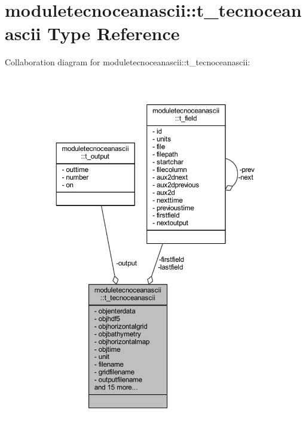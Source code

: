 \hypertarget{structmoduletecnoceanascii_1_1t__tecnoceanascii}{}\section{moduletecnoceanascii\+:\+:t\+\_\+tecnoceanascii Type Reference}
\label{structmoduletecnoceanascii_1_1t__tecnoceanascii}


Collaboration diagram for moduletecnoceanascii\+:\+:t\+\_\+tecnoceanascii\+:\nopagebreak
\begin{figure}[H]
\begin{center}
\leavevmode
\includegraphics[width=350pt]{structmoduletecnoceanascii_1_1t__tecnoceanascii__coll__graph}
\end{center}
\end{figure}
